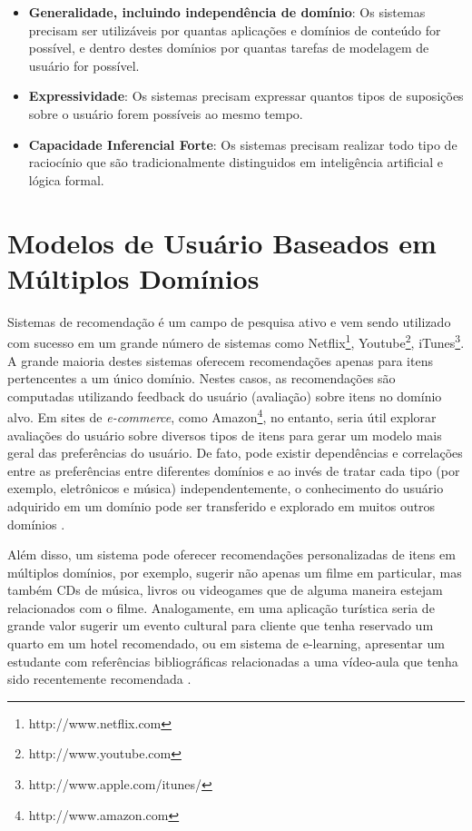 \begin{itemize}
	\item{\textbf{Generalidade, incluindo independência de domínio}: Os sistemas precisam ser utilizáveis por quantas aplicações e domínios de conteúdo for possível, e dentro destes domínios por quantas tarefas de modelagem de usuário for possível.}
	
	\item{\textbf{Expressividade}: Os sistemas precisam expressar quantos tipos de suposições sobre o usuário forem possíveis ao mesmo tempo.}
	
	\item{\textbf{Capacidade Inferencial Forte}: Os sistemas precisam realizar todo tipo de raciocínio que são tradicionalmente distinguidos em inteligência artificial e lógica formal.}
\end{itemize}






\section{Modelos de Usuário Baseados em Múltiplos Domínios}

Sistemas de recomendação é um campo de pesquisa ativo e vem sendo utilizado com sucesso em um grande número de sistemas como Netflix\footnote{http://www.netflix.com}, Youtube\footnote{http://www.youtube.com}, iTunes\footnote{http://www.apple.com/itunes/}. A grande maioria destes sistemas oferecem recomendações apenas para itens pertencentes a um único domínio. Nestes casos, as recomendações são computadas utilizando feedback do usuário (avaliação) sobre itens no domínio alvo. Em sites de \textit{e-commerce}, como Amazon\footnote{http://www.amazon.com}, no entanto, seria útil explorar avaliações do usuário sobre diversos tipos de itens para gerar um modelo mais geral das preferências do usuário. De fato, pode existir dependências e correlações entre as preferências entre diferentes domínios e ao invés de tratar cada tipo (por exemplo, eletrônicos e música) independentemente, o conhecimento do usuário adquirido em um domínio pode ser transferido e explorado em muitos outros domínios \citep{fernandez2012cross}.

Além disso, um sistema pode oferecer recomendações personalizadas de itens em múltiplos domínios, por exemplo, sugerir não apenas um filme em particular, mas também CDs de música, livros ou videogames que de alguma maneira estejam relacionados com o filme. Analogamente, em uma aplicação turística seria de grande valor sugerir um evento cultural para cliente que tenha reservado um quarto em um hotel recomendado, ou em sistema de e-learning, apresentar um estudante com referências bibliográficas relacionadas a uma vídeo-aula que tenha sido recentemente recomendada \citep{fernandez2012cross}.

